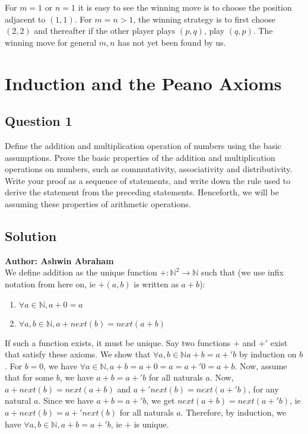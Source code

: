 \documentclass[12pt]{report}
\begin{document}
For $m = 1$ or $n = 1$ it is easy to see the winning move is to choose the position adjacent to $(1, 1)$. For $m = n > 1$, the winning strategy is to first choose $(2, 2)$ and thereafter if the other player plays $(p, q)$, play $(q, p)$. The winning move for general $m, n$ has not yet been found by us.
\chapter{Induction and the Peano Axioms}
\section*{Question 1}
Define the addition and multiplication operation of numbers using the basic assumptions. Prove the basic properties of the addition and multiplication operations on numbers, such as commutativity, associativity and distributivity.
Write your proof as a sequence of statements, and write down the rule used to derive the statement from the preceding statements. Henceforth, we will be assuming these properties of arithmetic operations.
\section*{Solution}
\textbf{Author: Ashwin Abraham}\\
We define addition as the unique function $+ : \mathbb{N}^2 \rightarrow \mathbb{N}$ such that (we use infix notation from here on, ie $+(a, b)$ is written as $a + b$):
\begin{enumerate}
  \item $\forall a \in \mathbb{N}, a + 0 = a$
  \item $\forall a, b \in \mathbb{N}, a + next(b) = next(a + b)$
\end{enumerate}

If such a function exists, it must be unique. Say two functions $+$ and $+'$ exist that satisfy these axioms. We show that $\forall a, b \in \mathbb{N} a + b = a +' b$ by induction on $b$. For $b = 0$, we have $\forall a \in \mathbb{N}, a + b = a + 0 = a = a +' 0 = a + b$. Now, assume that for some $b$, we have $ a + b = a +' b$ for all naturals $a$. Now, $a + next(b) = next(a + b)$ and $a +' next(b) = next(a +' b)$, for any natural $a$. Since we have $a + b = a +' b$, we get $next(a + b) = next(a +' b)$, ie $a + next(b) = a +' next(b)$ for all naturals $a$. Therefore, by induction, we have $\forall a, b \in \mathbb{N}, a + b = a +' b$, ie $+$ is unique.
\end{document}

